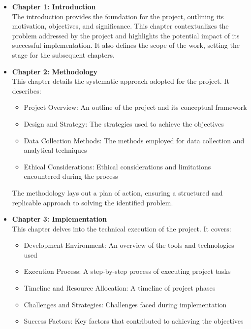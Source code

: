 \begin{itemize}
    \item \textbf{Chapter 1: Introduction}\\
    The introduction provides the foundation for the project, outlining its motivation, objectives, and significance. This chapter contextualizes the problem addressed by the project and highlights the potential impact of its successful implementation. It also defines the scope of the work, setting the stage for the subsequent chapters.

    \item \textbf{Chapter 2: Methodology}\\
    This chapter details the systematic approach adopted for the project. It describes:
    \begin{itemize}
        \item Project Overview: An outline of the project and its conceptual framework
        \item Design and Strategy: The strategies used to achieve the objectives
        \item Data Collection Methods: The methods employed for data collection and analytical techniques
        \item Ethical Considerations: Ethical considerations and limitations encountered during the process
    \end{itemize}
    The methodology lays out a plan of action, ensuring a structured and replicable approach to solving the identified problem.

    \item \textbf{Chapter 3: Implementation}\\
    This chapter delves into the technical execution of the project. It covers:
    \begin{itemize}
        \item Development Environment: An overview of the tools and technologies used
        \item Execution Process: A step-by-step process of executing project tasks
        \item Timeline and Resource Allocation: A timeline of project phases
        \item Challenges and Strategies: Challenges faced during implementation
        \item Success Factors: Key factors that contributed to achieving the objectives
    \end{itemize}


\end{itemize}
